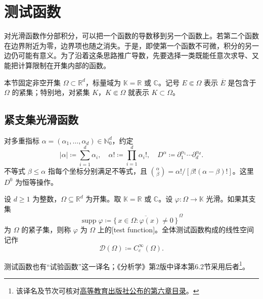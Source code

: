 \section{测试函数}
\label{b1:sec:2001}

对光滑函数作分部积分，可以把一个函数的导数移到另一个函数上。若第二个函数在边界附近为零，边界项也随之消失。于是，即使第一个函数不可微，积分的另一边仍可能有意义。为了沿着这条思路推广导数，先要选择一类既能任意次求导、又能把计算限制在开集内部的函数。

\ProseParagraphBreak

本节固定非空开集 \(\Omega\subset\mathbb R^d\)，标量域为 \(\mathbb K=\mathbb R\) 或 \(\mathbb C\)。记号 \(E\Subset\Omega\) 表示 \(\overline E\) 是包含于 \(\Omega\) 的紧集；特别地，对紧集 \(K\)，\(K\Subset\Omega\) 就表示 \(K\subset\Omega\)。

\subsection{紧支集光滑函数}
\label{b1:subsec:200101}

对多重指标 \(\alpha=(\alpha_1,\ldots,\alpha_d)\in\mathbb N_0^d\)，约定
\[
 |\alpha|\coloneqq\sum_{i=1}^d\alpha_i,\quad
 \alpha!\coloneqq\prod_{i=1}^d\alpha_i!,\quad
 D^\alpha\coloneqq\partial_1^{\alpha_1}\cdots\partial_d^{\alpha_d}.
\]
不等式 \(\beta\leq\alpha\) 指每个坐标分别满足不等式，且
\(\binom\alpha\beta=\alpha!/[\beta!(\alpha-\beta)!]\)。这里 \(D^0\) 为恒等操作。

\begin{definition}\label{b1:def:test-function}
设 \(d\geq1\) 为整数，\(\Omega\subseteq\mathbb R^d\) 为开集。取 \(\mathbb K=\mathbb R\) 或 \(\mathbb C\)。设 \(\varphi:\Omega\rightarrow\mathbb K\) 光滑。如果其支集
\[
 \operatorname{supp}\varphi
 \coloneqq\overline{\{\,x\in\Omega:\varphi(x)\ne0\,\}}^{\,\Omega}
\]
为 \(\Omega\) 的紧子集，则称 \(\varphi\) 为 \(\Omega\) 上的[test function]。全体测试函数构成的线性空间记作
\[
 \mathcal D(\Omega)\coloneqq C_c^\infty(\Omega).
\]
\end{definition}

测试函数也有“试验函数”这一译名；《分析学》第2版中译本第6.2节采用后者\footnote{该译名及节次可核对\href{https://academic.hep.com.cn/br/CN/chapter/978-7-04-017381-9/chapter06}{高等教育出版社公布的第六章目录}。}。

